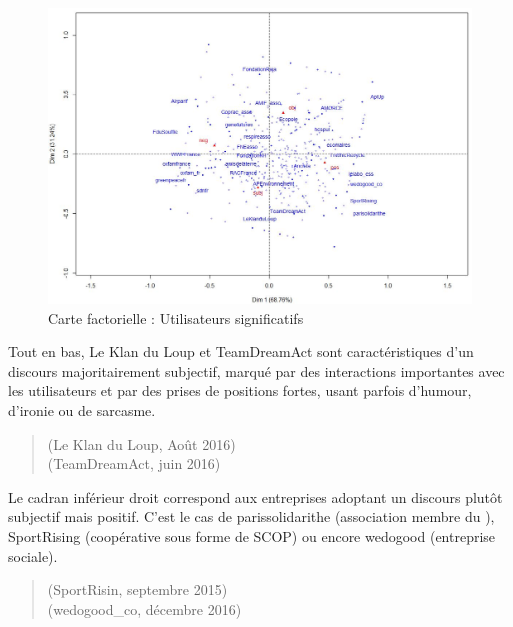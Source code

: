             \begin{figure}
                \caption{Carte factorielle : Utilisateurs significatifs}
                \label{fig:AFCentreprises}
                \includegraphics[width=\linewidth]{fig/AFC_entreprises.JPG}
            \end{figure}

            Tout en bas, Le Klan du Loup et TeamDreamAct sont caractéristiques d’un discours majoritairement subjectif, marqué par des interactions importantes avec les utilisateurs et par des prises de positions fortes, usant parfois d’humour, d’ironie ou de sarcasme.


            \begin{quotation}
                 (Le Klan du Loup, Août 2016) \\
                 (TeamDreamAct, juin 2016)
            \end{quotation}

            Le cadran inférieur droit correspond aux entreprises adoptant un discours plutôt subjectif mais positif. C’est le cas de parissolidarithe (association membre du \mouves), SportRising (coopérative sous forme de SCOP) ou encore wedogood (entreprise sociale).

            \begin{quotation}
                (SportRisin, septembre 2015) \\
                 (wedogood\_co, décembre 2016)

            \end{quotation}



